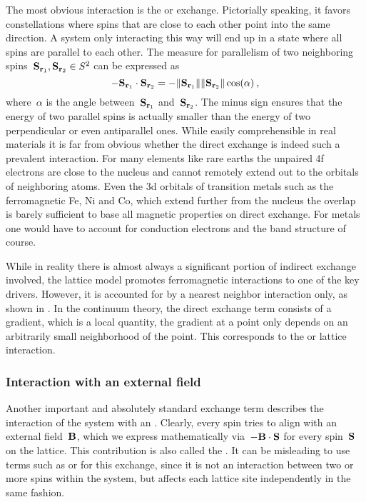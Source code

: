 The most obvious interaction is the  or 
exchange. Pictorially speaking, it favors constellations where spins that are
close to each other point into the same direction. A system only interacting
this way will end up in a state where all spins are parallel to each other. The
measure for parallelism of two neighboring spins~$\S_{\r_1}, \S_{\r_2} \in S^2$
can be expressed as
%
\begin{equation}
  -\S_{\r_1} \cdot \S_{\r_2} =
  -\norm{\S_{\r_1}} \norm{\S_{\r_2}} \cos(\alpha) \:,
\end{equation}
%
where~$\alpha$ is the angle between~$\S_{\r_1}$ and~$\S_{\r_2}$. The minus sign
ensures that the energy of two parallel spins is actually smaller than the
energy of two perpendicular or even antiparallel ones. While easily
comprehensible in real materials it is far from obvious whether the direct
exchange is indeed such a prevalent interaction. For many elements like rare
earths the unpaired 4f electrons are close to the nucleus and cannot remotely
extend out to the orbitals of neighboring atoms. Even the 3d orbitals of
transition metals such as the ferromagnetic Fe, Ni and Co, which extend further
from the nucleus the overlap is barely sufficient to base all magnetic
properties on direct exchange. For metals one would have to account for
conduction electrons and the band structure of course.

While in reality there is almost always a significant portion of indirect
exchange involved, the lattice model promotes ferromagnetic interactions to one
of the key drivers. However, it is accounted for by a nearest neighbor
interaction only, as shown in . In the continuum theory, the
direct exchange term consists of a gradient, which is a local quantity, \ie{}
the gradient at a point only depends on an arbitrarily small neighborhood of the
point. This corresponds to the  or  lattice
interaction.

\subsubsection{Interaction with an external field}

Another important and absolutely standard exchange term describes the
interaction of the system with an . Clearly,
every spin tries to align with an external field~$\B$, which we express
mathematically via~$-\B \cdot \S$ for every spin~$\S$ on the lattice. This
contribution is also called the . It can be misleading to
use terms such as  or  for this
exchange, since it is not an interaction between two or more spins within the
system, but affects each lattice site independently in the same fashion.

